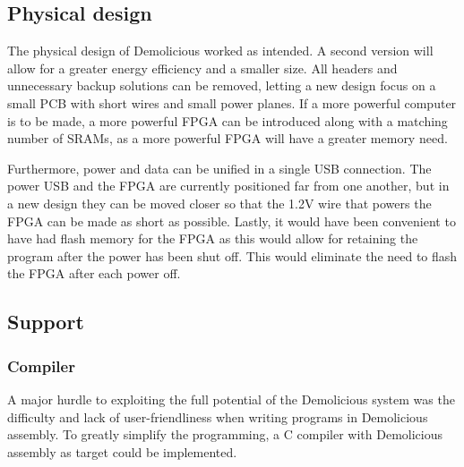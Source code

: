 \documentclass[../main/report.tex]{subfiles}
\begin{document}
\subsection{Physical design}
The physical design of Demolicious worked as intended.
A second version will allow for a greater energy efficiency and a smaller size.
All headers and unnecessary backup solutions can be removed, letting a new design focus on a small PCB with short wires and small power planes.
If a more powerful computer is to be made, a more powerful FPGA can be introduced along with a matching number of SRAMs, as a more powerful FPGA will have a greater memory need.

Furthermore, power and data can be unified in a single USB connection.
The power USB and the FPGA are currently positioned far from one another, but in a new design they can be moved closer so that the 1.2V wire that powers the FPGA can be made as short as possible.
Lastly, it would have been convenient to have had flash memory for the FPGA as this would allow for retaining the program after the power has been shut off.
This would eliminate the need to flash the FPGA after each power off.

\subsection{Support}
\subsubsection*{Compiler}
A major hurdle to exploiting the full potential of the Demolicious system was the difficulty and lack of user-friendliness when writing programs in Demolicious assembly.
To greatly simplify the programming, a C compiler with Demolicious assembly as target could be implemented.
\end{document}
